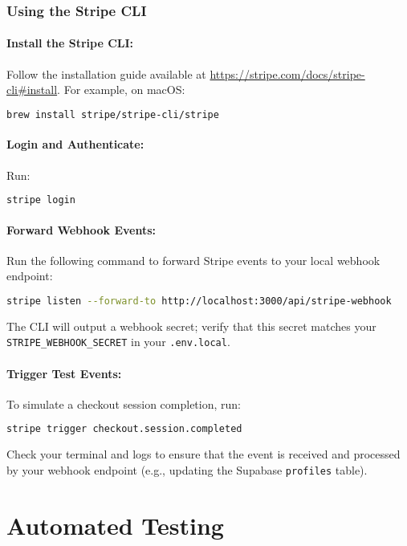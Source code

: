 \documentclass[11pt]{article}
\begin{document}
\subsubsection{Using the Stripe CLI}

\paragraph{Install the Stripe CLI:}
Follow the installation guide available at \url{https://stripe.com/docs/stripe-cli#install}. For example, on macOS:
\begin{lstlisting}[language=bash]
brew install stripe/stripe-cli/stripe
\end{lstlisting}

\paragraph{Login and Authenticate:}
Run:
\begin{lstlisting}[language=bash]
stripe login
\end{lstlisting}

\paragraph{Forward Webhook Events:}
Run the following command to forward Stripe events to your local webhook endpoint:
\begin{lstlisting}[language=bash]
stripe listen --forward-to http://localhost:3000/api/stripe-webhook
\end{lstlisting}
The CLI will output a webhook secret; verify that this secret matches your \texttt{STRIPE\_WEBHOOK\_SECRET} in your \texttt{.env.local}.

\paragraph{Trigger Test Events:}
To simulate a checkout session completion, run:
\begin{lstlisting}[language=bash]
stripe trigger checkout.session.completed
\end{lstlisting}
Check your terminal and logs to ensure that the event is received and processed by your webhook endpoint (e.g., updating the Supabase \texttt{profiles} table).

\section{Automated Testing}
\end{document}
